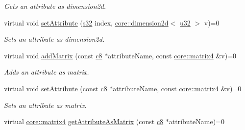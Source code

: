 \begin{DoxyCompactItemize}
\begin{DoxyCompactList}\small\item\em Gets an attribute as dimension2d. \end{DoxyCompactList}\item 
\mbox{\label{classirr_1_1io_1_1IAttributes_ad2019a4dbefb6b45b80fe702fe99d3ae}} 
virtual void \hyperlink{classirr_1_1io_1_1IAttributes_ad2019a4dbefb6b45b80fe702fe99d3ae}{set\+Attribute} (\hyperlink{namespaceirr_ac66849b7a6ed16e30ebede579f9b47c6}{s32} index, \hyperlink{classirr_1_1core_1_1dimension2d}{core\+::dimension2d}$<$ \hyperlink{namespaceirr_a0416a53257075833e7002efd0a18e804}{u32} $>$ v)=0
\begin{DoxyCompactList}\small\item\em Sets an attribute as dimension2d. \end{DoxyCompactList}\item 
\mbox{\label{classirr_1_1io_1_1IAttributes_a766631588618287f20af1f66f21fca3d}} 
virtual void \hyperlink{classirr_1_1io_1_1IAttributes_a766631588618287f20af1f66f21fca3d}{add\+Matrix} (const \hyperlink{namespaceirr_a9395eaea339bcb546b319e9c96bf7410}{c8} $\ast$attribute\+Name, const \hyperlink{namespaceirr_1_1core_a73fa92e638c5ca97efd72da307cc9b65}{core\+::matrix4} \&v)=0
\begin{DoxyCompactList}\small\item\em Adds an attribute as matrix. \end{DoxyCompactList}\item 
\mbox{\label{classirr_1_1io_1_1IAttributes_ad722717549e321ad37e6a63a9dde6365}} 
virtual void \hyperlink{classirr_1_1io_1_1IAttributes_ad722717549e321ad37e6a63a9dde6365}{set\+Attribute} (const \hyperlink{namespaceirr_a9395eaea339bcb546b319e9c96bf7410}{c8} $\ast$attribute\+Name, const \hyperlink{namespaceirr_1_1core_a73fa92e638c5ca97efd72da307cc9b65}{core\+::matrix4} \&v)=0
\begin{DoxyCompactList}\small\item\em Sets an attribute as matrix. \end{DoxyCompactList}\item 
virtual \hyperlink{namespaceirr_1_1core_a73fa92e638c5ca97efd72da307cc9b65}{core\+::matrix4} \hyperlink{classirr_1_1io_1_1IAttributes_a0329ce7827096c56f3c7e905afe04ced}{get\+Attribute\+As\+Matrix} (const \hyperlink{namespaceirr_a9395eaea339bcb546b319e9c96bf7410}{c8} $\ast$attribute\+Name)=0

\end{DoxyCompactItemize}
